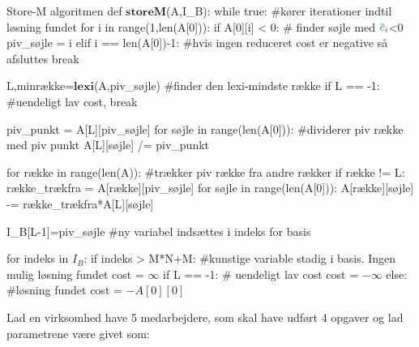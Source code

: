\begin{alg}[label={alg:storem2}]{Store-M algoritmen}
def $\textbf{storeM}$(A,I_B):
    while true: #kører iterationer indtil løsning fundet
    	for i in range(1,len(A[0])): 
        	if A[0][i] < 0: # finder søjle med ${\color{commentgreen} \overline{c}_i}$<0
            	piv_søjle = i
        	elif i == len(A[0])-1: #hvis ingen reduceret cost er negative så afsluttes
				break
            
    	L,minrække=$\textbf{lexi}$(A,piv_søjle) #finder den lexi-mindste række
    	if L == -1: #uendeligt lav cost,
			break
            
    	piv_punkt = A[L][piv_søjle] 
    	for søjle in range(len(A[0])): #dividerer piv række med piv punkt
        	A[L][søjle] /= piv_punkt
            
    	for række in range(len(A)): #trækker piv række fra andre rækker
        	if række != L:
            	række_trækfra = A[række][piv_søjle]
            	for søjle in range(len(A[0])):
                	A[række][søjle] -= række_trækfra*A[L][søjle]

    	I_B[L-1]=piv_søjle #ny variabel indsættes i indeks for basis

	for indeks in $I_B$: 
		if indeks > M*N+M: #kunstige variable stadig i basis. Ingen mulig løsning fundet
			cost = $\infty$
	if L == -1: # uendeligt lav cost
		cost = $-\infty$
	else: #løsning fundet
		cost = $-A[0][0]$
\end{alg}

\begin{eks}
Lad en virksomhed have 5 medarbejdere, som skal have udført 4 opgaver og lad parametrene være givet som:
\end{eks}